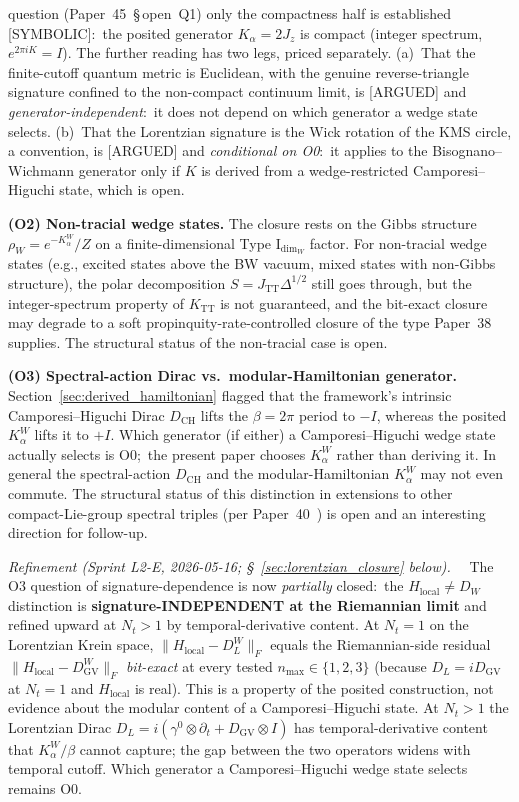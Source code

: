 \documentclass[11pt,a4paper]{article}
\theoremstyle{plain}
\theoremstyle{definition}
\newcommand{\DCH}{D_{\mathrm{CH}}}
\newcommand{\TT}{\mathrm{TT}}
\begin{document}
question (Paper~45~\S\,open~Q1) only the compactness half is established
[SYMBOLIC]:\ the posited generator $K_\alpha = 2J_z$ is compact (integer
spectrum, $e^{2\pi i K} = I$).  The further reading has two legs,
priced separately.  (a)~That the finite-cutoff quantum metric is
Euclidean, with the genuine reverse-triangle signature confined to the
non-compact continuum limit, is [ARGUED] and \emph{generator-independent}:\
it does not depend on which generator a wedge state selects.
(b)~That the Lorentzian signature is the Wick rotation of the KMS circle,
a convention, is [ARGUED] and \emph{conditional on O0}:\ it applies to
the Bisognano--Wichmann generator only if $K$ is derived from a
wedge-restricted Camporesi--Higuchi state, which is open.

\textbf{(O2) Non-tracial wedge states.}
The closure rests on the Gibbs structure
$\rho_W = e^{-K_\alpha^W}/Z$ on a finite-dimensional Type I$_{\dim_W}$
factor. For non-tracial wedge states (e.g., excited states above the
BW vacuum, mixed states with non-Gibbs structure), the polar
decomposition $S = J_{\TT} \Delta^{1/2}$ still goes through, but the
integer-spectrum property of $K_{\TT}$ is not guaranteed, and the
bit-exact closure may degrade to a soft propinquity-rate-controlled
closure of the type Paper~38 supplies. The structural status of the
non-tracial case is open.

\textbf{(O3) Spectral-action Dirac vs.\ modular-Hamiltonian generator.}
Section~\ref{sec:derived_hamiltonian} flagged that the framework's
intrinsic Camporesi--Higuchi Dirac $\DCH$ lifts the $\beta = 2\pi$
period to $-I$, whereas the posited $K_\alpha^W$ lifts it to $+I$.
Which generator (if either) a Camporesi--Higuchi wedge state actually
selects is O0;\ the present paper chooses $K_\alpha^W$ rather than
deriving it. In
general the spectral-action $\DCH$ and the modular-Hamiltonian
$K_\alpha^W$ may not even commute. The structural status of this
distinction in extensions to other compact-Lie-group spectral triples
(per Paper~40~\cite{paper40_unified}) is open and an interesting
direction for follow-up.

\emph{Refinement (Sprint L2-E, 2026-05-16; \S~\ref{sec:lorentzian_closure} below).}\ \ %
The O3 question of signature-dependence is now \emph{partially}
closed:\ the $H_{\mathrm{local}} \ne D_W$ distinction is
\textbf{signature-INDEPENDENT at the Riemannian limit} and refined
upward at $N_t > 1$ by temporal-derivative content.  At $N_t = 1$
on the Lorentzian Krein space, $\|H_{\mathrm{local}} - D_L^W\|_F$
equals the Riemannian-side residual $\|H_{\mathrm{local}} - D_{\mathrm{GV}}^W\|_F$
\emph{bit-exact} at every tested $n_{\max} \in \{1, 2, 3\}$ (because
$D_L = iD_{\mathrm{GV}}$ at $N_t = 1$ and $H_{\mathrm{local}}$ is
real).  This is a property of the posited construction, not evidence
about the modular content of a Camporesi--Higuchi state.  At $N_t > 1$
the Lorentzian Dirac
$D_L = i(\gamma^0 \otimes \partial_t + D_{\mathrm{GV}} \otimes I)$
has temporal-derivative content that $K_\alpha^W / \beta$ cannot
capture; the gap between the two operators widens with temporal
cutoff.  Which generator a Camporesi--Higuchi wedge state selects
remains O0.
\end{document}
